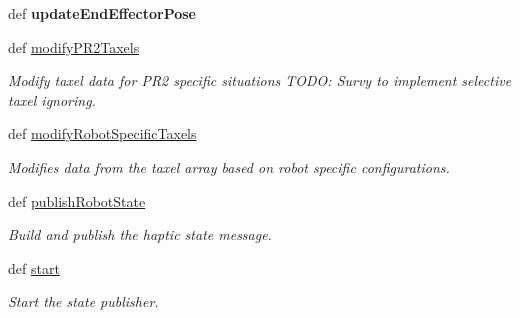 \begin{DoxyCompactItemize}
\item 
\hypertarget{classhrl__haptic__mpc_1_1robot__haptic__state__node_1_1_robot_haptic_state_server_a8d32837048e3a5b0cbe233b85c6fb91a}{def {\bfseries update\-End\-Effector\-Pose}}\label{classhrl__haptic__mpc_1_1robot__haptic__state__node_1_1_robot_haptic_state_server_a8d32837048e3a5b0cbe233b85c6fb91a}

\item 
def \hyperlink{classhrl__haptic__mpc_1_1robot__haptic__state__node_1_1_robot_haptic_state_server_aa08a7ebf85c907d79518e8081074663d}{modify\-P\-R2\-Taxels}
\begin{DoxyCompactList}\small\item\em \-Modify taxel data for \-P\-R2 specific situations \-T\-O\-D\-O\-: \-Survy to implement selective taxel ignoring. \end{DoxyCompactList}\item 
def \hyperlink{classhrl__haptic__mpc_1_1robot__haptic__state__node_1_1_robot_haptic_state_server_af698b8ed4a875a3c3278826d98cdd4bb}{modify\-Robot\-Specific\-Taxels}
\begin{DoxyCompactList}\small\item\em \-Modifies data from the taxel array based on robot specific configurations. \end{DoxyCompactList}\item 
def \hyperlink{classhrl__haptic__mpc_1_1robot__haptic__state__node_1_1_robot_haptic_state_server_a93064080ef34fa088ba92f047c7e7f65}{publish\-Robot\-State}
\begin{DoxyCompactList}\small\item\em \-Build and publish the haptic state message. \end{DoxyCompactList}\item 
\hypertarget{classhrl__haptic__mpc_1_1robot__haptic__state__node_1_1_robot_haptic_state_server_a21ca337b1dc5810d7a76b26aa6a47d47}{def \hyperlink{classhrl__haptic__mpc_1_1robot__haptic__state__node_1_1_robot_haptic_state_server_a21ca337b1dc5810d7a76b26aa6a47d47}{start}}\label{classhrl__haptic__mpc_1_1robot__haptic__state__node_1_1_robot_haptic_state_server_a21ca337b1dc5810d7a76b26aa6a47d47}

\begin{DoxyCompactList}\small\item\em \-Start the state publisher. \end{DoxyCompactList}\end{DoxyCompactItemize}
